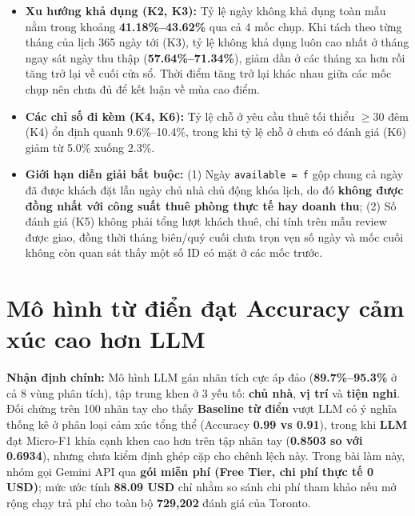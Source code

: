 \begin{itemize}
  \item \textbf{Xu hướng khả dụng (K2, K3):} Tỷ lệ ngày không khả dụng toàn mẫu nằm trong khoảng \textbf{41.18\%--43.62\%} qua cả 4 mốc chụp. Khi tách theo từng tháng của lịch 365 ngày tới (K3), tỷ lệ không khả dụng luôn cao nhất ở tháng ngay sát ngày thu thập (\textbf{57.64\%--71.34\%}), giảm dần ở các tháng xa hơn rồi tăng trở lại về cuối cửa sổ. Thời điểm tăng trở lại khác nhau giữa các mốc chụp nên chưa đủ để kết luận về mùa cao điểm.
  \item \textbf{Các chỉ số đi kèm (K4, K6):} Tỷ lệ chỗ ở yêu cầu thuê tối thiểu $\ge 30$ đêm (K4) ổn định quanh 9.6\%--10.4\%, trong khi tỷ lệ chỗ ở chưa có đánh giá (K6) giảm từ 5.0\% xuống 2.3\%.
  \item \textbf{Giới hạn diễn giải bắt buộc:} (1) Ngày \texttt{available = f} gộp chung cả ngày đã được khách đặt lẫn ngày chủ nhà chủ động khóa lịch, do đó \textbf{không được đồng nhất với công suất thuê phòng thực tế hay doanh thu}; (2) Số đánh giá (K5) không phải tổng lượt khách thuê, chỉ tính trên mẫu review được giao, đồng thời tháng biên/quý cuối chưa trọn vẹn số ngày và mốc cuối không còn quan sát thấy một số ID có mặt ở các mốc trước.
\end{itemize}



\FloatBarrier
\section{Mô hình từ điển đạt Accuracy cảm xúc cao hơn LLM}

\textbf{Nhận định chính:} Mô hình LLM gán nhãn tích cực áp đảo (\textbf{89.7\%--95.3\%} ở cả 8 vùng phân tích), tập trung khen ở 3 yếu tố: \textbf{chủ nhà}, \textbf{vị trí} và \textbf{tiện nghi}. Đối chứng trên 100 nhãn tay cho thấy \textbf{Baseline từ điển} vượt LLM có ý nghĩa thống kê ở phân loại cảm xúc tổng thể (Accuracy \textbf{0.99 vs 0.91}), trong khi \textbf{LLM} đạt Micro-F1 khía cạnh khen cao hơn trên tập nhãn tay (\textbf{0.8503 so với 0.6934}), nhưng chưa kiểm định ghép cặp cho chênh lệch này. Trong bài làm này, nhóm gọi Gemini API qua \textbf{gói miễn phí (Free Tier, chi phí thực tế 0 USD)}; mức ước tính \textbf{88.09 USD} chỉ nhằm so sánh chi phí tham khảo nếu mở rộng chạy trả phí cho toàn bộ \textbf{729,202} đánh giá của Toronto.

